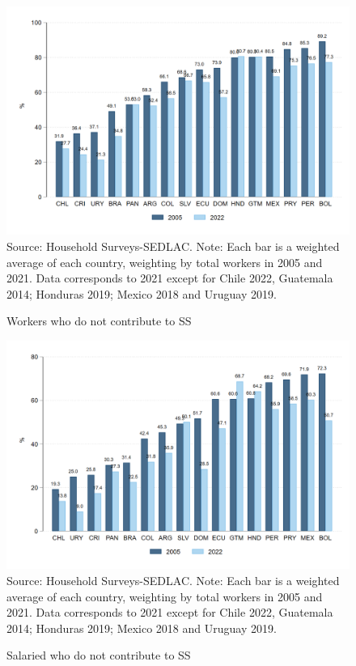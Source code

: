 \documentclass[english]{article}
\begin{document}
\begin{itemize}
\begin{figure}[!htb]
    \justifying
     \caption{Workers who do not contribute to SS}     
     \includegraphics[scale=.3]{latex/figures/Snapshot/snapshot_informal_ss.png}
    \label{fig:SalariedSS}
    \footnotesize{Source: Household Surveys-SEDLAC.}
    \footnotesize{Note: Each bar is a weighted average of each country, weighting by total workers in 2005 and 2021.  Data corresponds to 2021 except for Chile 2022, Guatemala 2014; Honduras 2019; Mexico 2018 and Uruguay 2019.}
\end{figure}

\begin{figure}[!htb]
    \justifying
     \caption{Salaried who do not contribute to SS}     
     \includegraphics[scale=.3]{latex/figures/Snapshot/snapshot_informal_ss_dep.png}
    \label{fig:SalariedSS}
    \footnotesize{Source: Household Surveys-SEDLAC.}
    \footnotesize{Note: Each bar is a weighted average of each country, weighting by total workers in 2005 and 2021.  Data corresponds to 2021 except for Chile 2022, Guatemala 2014; Honduras 2019; Mexico 2018 and Uruguay 2019.}
\end{figure}


\end{itemize}
\end{document}
